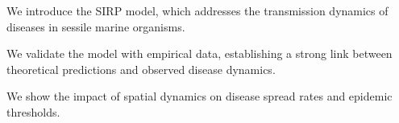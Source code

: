 \vspace{1cm}

\begin{contributionslist}
  \item We introduce the SIRP model, which addresses the
  transmission dynamics of diseases in sessile marine organisms.
  \item  We validate the model with empirical data, establishing a
  strong link between theoretical predictions and observed disease dynamics.
  \item We show the impact of spatial dynamics on disease spread rates and
  epidemic thresholds.
\end{contributionslist}
